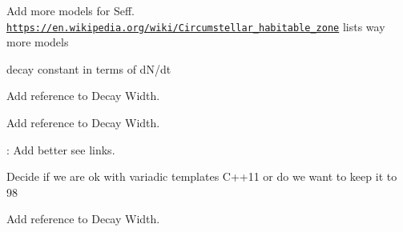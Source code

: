 
\begin{DoxyRefList}
\item[\label{todo__todo000001}%
\Hypertarget{todo__todo000001}%
Namespace \hyperlink{namespace_e_g_x_phys}{E\+G\+X\+Phys} ]Add more models for Seff. \href{https://en.wikipedia.org/wiki/Circumstellar_habitable_zone}{\tt https\+://en.\+wikipedia.\+org/wiki/\+Circumstellar\+\_\+habitable\+\_\+zone} lists way more models 

decay constant in terms of d\+N/dt  
\item[\label{todo__todo000003}%
\Hypertarget{todo__todo000003}%
Module \hyperlink{group___half_life}{Half\+Life} ]Add reference to Decay Width.  
\item[\label{todo__todo000004}%
\Hypertarget{todo__todo000004}%
Module \hyperlink{group___nuclear_binding_energy}{Nuclear\+Binding\+Energy} ]Add reference to Decay Width.  
\item[\label{todo__todo000005}%
\Hypertarget{todo__todo000005}%
File \hyperlink{_nuclear_separation_energy_8hpp}{Nuclear\+Separation\+Energy.hpp} ]\+: Add better see links.  
\item[\label{todo__todo000006}%
\Hypertarget{todo__todo000006}%
File \hyperlink{_q_value_8hpp}{Q\+Value.hpp} ]Decide if we are ok with variadic templates C++11 or do we want to keep it to 98  
\item[\label{todo__todo000007}%
\Hypertarget{todo__todo000007}%
Module \hyperlink{group___semi_empirical_mass_formula}{Semi\+Empirical\+Mass\+Formula} ]Add reference to Decay Width. 
\end{DoxyRefList}